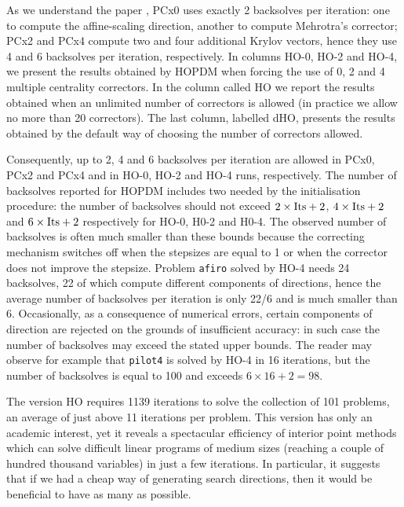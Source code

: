 As we understand the paper \cite{MehrotraLi}, PCx0 uses exactly 
2 backsolves per iteration: one to compute the affine-scaling direction,
another to compute Mehrotra's corrector; PCx2 and PCx4 compute 
two and four additional Krylov vectors, hence they use
4 and 6 backsolves per iteration, respectively.
In columns HO-0, HO-2 and HO-4, we present 
the results obtained by HOPDM when forcing the use of 0, 2 and 4 
multiple centrality correctors. 
In the column called HO\raisebox{1pt}{-$\infty$} we report the results 
obtained when an unlimited number of correctors is allowed
(in practice we allow no more than 20 correctors).
The last column, labelled dHO, presents the results obtained 
by the default way of choosing the number of correctors allowed.

Consequently, up to 2, 4 and 6 backsolves per iteration are allowed
in PCx0, PCx2 and PCx4 and in HO-0, HO-2 and HO-4 runs, respectively.
The number of backsolves reported for HOPDM includes two needed by 
the initialisation procedure: the number of backsolves 
should not exceed $2 \times {\rm {Its}} + 2$, 
$4 \times {\rm {Its}} + 2$ and $6 \times {\rm {Its}} + 2$ respectively
for HO-0, H0-2 and H0-4.
The observed number of backsolves is often much smaller
than these bounds because the correcting mechanism switches off 
when the stepsizes are equal to 1 or when the corrector does not 
improve the stepsize. Problem {\tt afiro} solved by HO-4 needs 24 
backsolves, 22 of which compute different components of directions, 
hence the average number of backsolves per iteration is only 22/6 
and is much smaller than 6. Occasionally,
as a consequence of numerical errors, certain components 
of direction are rejected on the grounds of insufficient accuracy:
in such case the number of backsolves may exceed the stated upper bounds.
The reader may observe for example that {\tt pilot4} is solved by HO-4
in 16 iterations, but the number of backsolves is equal to 100 and 
exceeds $6 \times 16 + 2 = 98$.

The version HO\raisebox{1pt}{-$\infty$} requires 1139 iterations to solve 
the collection of 101 problems, an average of just above 11 iterations
per problem. This version has only an academic interest, 
yet it reveals a spectacular efficiency of interior point 
methods which can solve difficult linear programs of medium sizes 
(reaching a couple of hundred thousand variables) in just 
a few iterations.
In particular, it suggests that if we had a cheap way of generating
search directions, then it would be beneficial to have as many as possible.

